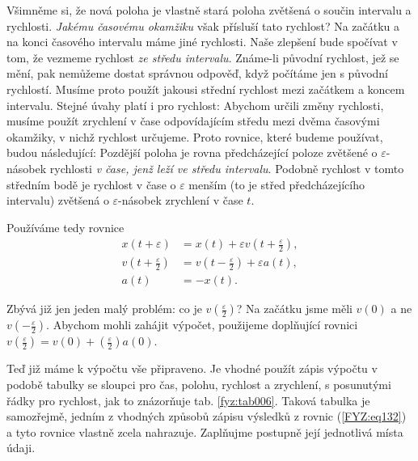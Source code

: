 {{    Všimněme si, že nová poloha je vlastně stará poloha zvětšená o součin intervalu a rychlosti. 
    \emph{Jakému časovému okamžiku} však přísluší tato rychlost? Na začátku a na konci časového 
    intervalu máme jiné rychlosti. Naše zlepšení bude spočívat v tom, že vezmeme rychlost \emph{ze 
    středu intervalu}. Známe-li původní rychlost, jež se mění, pak nemůžeme dostat správnou 
    odpověď, když počítáme jen s původní rychlostí. Musíme proto použít jakousi střední rychlost 
    mezi začátkem a koncem intervalu. Stejné úvahy platí i pro rychlost: Abychom určili změny 
    rychlosti, musíme použít zrychlení v čase odpovídajícím středu mezi dvěma časovými okamžiky, v 
    nichž rychlost určujeme. Proto rovnice, které budeme používat, budou následující: Pozdější 
    poloha je rovna předcházející poloze zvětšené o \(\varepsilon\)-násobek rychlosti \emph{v čase, 
    jenž leží ve středu intervalu}. Podobně rychlost v tomto středním bodě je rychlost v čase o 
    \(\varepsilon\) menším (to je střed předcházejícího intervalu) zvětšená o 
    \(\varepsilon\)-násobek zrychlení v čase \(t\).
    
    Používáme tedy rovnice
    \begin{subequations}
      \label{FYZ:eq132} 
      \begin{align}
      x(t+\varepsilon) 
           &= x(t) + \varepsilon v\left(t+\frac{\varepsilon}{2}\right), \label{FYZ:eq132a} \\
      v(t+\frac{\varepsilon}{2}) 
           &= v\left(t-\frac{\varepsilon}{2}\right) + \varepsilon a(t), \label{FYZ:eq132b} \\
      a(t) &= -x(t).                                                    \label{FYZ:eq132c}
      \end{align}
    \end{subequations}
    
    Zbývá již jen jeden malý problém: co je \(v(\frac{\varepsilon}{2})\)? Na začátku jsme měli 
    \(v(0)\) a ne \(v(-\frac{\varepsilon}{2})\). Abychom mohli zahájit výpočet, použijeme 
    doplňující rovnici \(v(\frac{\varepsilon}{2}) = v(0) + (\frac{\varepsilon}{2})a(0)\).
    
    Teď již máme k výpočtu vše připraveno. Je vhodné použít zápis výpočtu v podobě tabulky se 
    sloupci pro čas, polohu, rychlost a zrychlení, s posunutými řádky pro rychlost, jak to 
    znázorňuje tab. \ref{fyz:tab006}. Taková tabulka je samozřejmě, jedním z vhodných způsobů 
    zápisu výsledků z  rovnic (\ref{FYZ:eq132}) a tyto rovnice vlastně zcela nahrazuje. Zaplňujme 
    postupně její jednotlivá místa údaji.
    
}}
